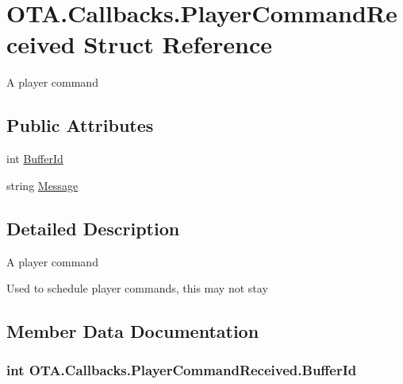\hypertarget{struct_o_t_a_1_1_callbacks_1_1_player_command_received}{}\section{O\+T\+A.\+Callbacks.\+Player\+Command\+Received Struct Reference}
\label{struct_o_t_a_1_1_callbacks_1_1_player_command_received}


A player command  


\subsection*{Public Attributes}
\begin{DoxyCompactItemize}
\item 
int \hyperlink{struct_o_t_a_1_1_callbacks_1_1_player_command_received_a966588b01897d9ab8e90b947122e9dfe}{Buffer\+Id}
\item 
string \hyperlink{struct_o_t_a_1_1_callbacks_1_1_player_command_received_aae7bbe0aa055931738d97ff219971f59}{Message}
\end{DoxyCompactItemize}


\subsection{Detailed Description}
A player command 

Used to schedule player commands, this may not stay

\subsection{Member Data Documentation}
\hypertarget{struct_o_t_a_1_1_callbacks_1_1_player_command_received_a966588b01897d9ab8e90b947122e9dfe}{}
\subsubsection[{Buffer\+Id}]{\setlength{\rightskip}{0pt plus 5cm}int O\+T\+A.\+Callbacks.\+Player\+Command\+Received.\+Buffer\+Id}\label{struct_o_t_a_1_1_callbacks_1_1_player_command_received_a966588b01897d9ab8e90b947122e9dfe}
\hypertarget{struct_o_t_a_1_1_callbacks_1_1_player_command_received_aae7bbe0aa055931738d97ff219971f59}{}
